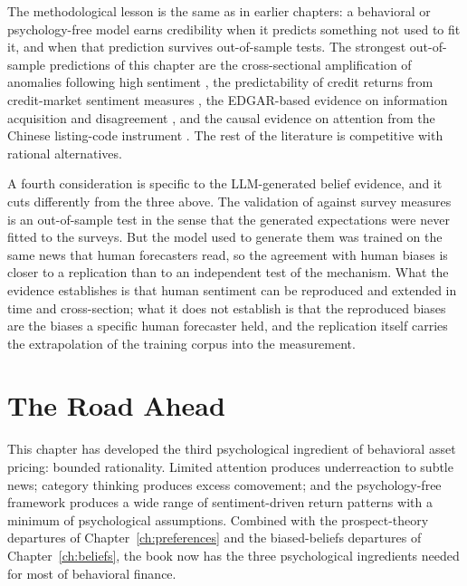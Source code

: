 The methodological lesson is the same as in earlier chapters: a behavioral or psychology-free model earns credibility when it predicts something not used to fit it, and when that prediction survives out-of-sample tests. The strongest out-of-sample predictions of this chapter are the cross-sectional amplification of anomalies following high sentiment \citep{stambaughyuyuan2012}, the predictability of credit returns from credit-market sentiment measures \citep{greenwoodhanson2013}, the EDGAR-based evidence on information acquisition and disagreement \citep{lisun2022,chang2022}, and the causal evidence on attention from the Chinese listing-code instrument \citep{chenawy2023}. The rest of the literature is competitive with rational alternatives.

A fourth consideration is specific to the LLM-generated belief evidence, and it cuts differently from the three above. The validation of \citet{bybee2025} against survey measures is an out-of-sample test in the sense that the generated expectations were never fitted to the surveys. But the model used to generate them was trained on the same news that human forecasters read, so the agreement with human biases is closer to a replication than to an independent test of the mechanism. What the evidence establishes is that human sentiment can be reproduced and extended in time and cross-section; what it does not establish is that the reproduced biases are the biases a specific human forecaster held, and the replication itself carries the extrapolation of the training corpus into the measurement.

\section{The Road Ahead}
\label{sec:attahead}

This chapter has developed the third psychological ingredient of behavioral asset pricing: bounded rationality. Limited attention produces underreaction to subtle news; category thinking produces excess comovement; and the psychology-free framework produces a wide range of sentiment-driven return patterns with a minimum of psychological assumptions. Combined with the prospect-theory departures of Chapter~\ref{ch:preferences} and the biased-beliefs departures of Chapter~\ref{ch:beliefs}, the book now has the three psychological ingredients needed for most of behavioral finance.

